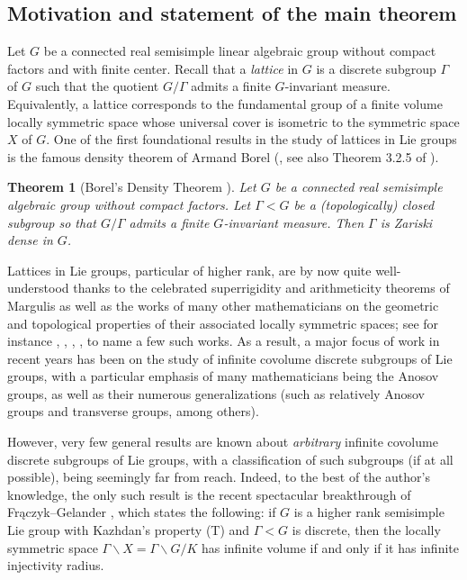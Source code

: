 \documentclass[psamsfonts]{amsart}
\newtheorem{thm}{Theorem}[section]
\theoremstyle{definition}
\theoremstyle{remark}
\numberwithin{equation}{section}
\begin{document}
\subsection{Motivation and statement of the main theorem}
Let $G$ be a connected real semisimple linear algebraic group without compact factors and with finite center. Recall that a \emph{lattice} in $G$ is a discrete subgroup $\Gamma$ of $G$ such that the quotient $G/\Gamma$ admits a finite $G$-invariant measure. Equivalently, a lattice corresponds to the fundamental group of a finite volume locally symmetric space whose universal cover is isometric to the symmetric space $X$ of $G$. One of the first foundational results in the study of lattices in Lie groups is the famous density theorem of Armand Borel (\cite{Bor}, see also Theorem 3.2.5 of \cite{Zim}).
\begin{thm} [Borel's Density Theorem \cite{Bor}]
Let $G$ be a connected real semisimple algebraic group without compact factors. Let $\Gamma < G$ be a (topologically) closed subgroup so that $G/\Gamma$ admits a finite $G$-invariant measure. Then $\Gamma$ is Zariski dense in $G$.
\end{thm}
Lattices in Lie groups, particular of higher rank, are by now quite well-understood thanks to the celebrated superrigidity and arithmeticity theorems of Margulis \cite{Mar} as well as the works of many other mathematicians on the geometric and topological properties of their associated locally symmetric spaces; see for instance \cite{ABBGNRS}, \cite{FHR1}, \cite{FHR2}, \cite{FMW}, to name a few such works. As a result, a major focus of work in recent years has been on the study of infinite covolume discrete subgroups of Lie groups, with a particular emphasis of many mathematicians being the Anosov groups, as well as their numerous generalizations (such as relatively Anosov groups and transverse groups, among others).
\par 
However, very few general results are known about \emph{arbitrary} infinite covolume discrete subgroups of Lie groups, with a classification of such subgroups (if at all possible), being seemingly far from reach. Indeed, to the best of the author's knowledge, the only such result is the recent spectacular breakthrough of Frączyk--Gelander \cite{FG}, which states the following: if $G$ is a higher rank semisimple Lie group with Kazhdan's property (T) and $\Gamma < G$ is discrete, then the locally symmetric space $\Gamma \backslash X = \Gamma \backslash G / K$ has infinite volume if and only if it has infinite injectivity radius.
\end{document}
